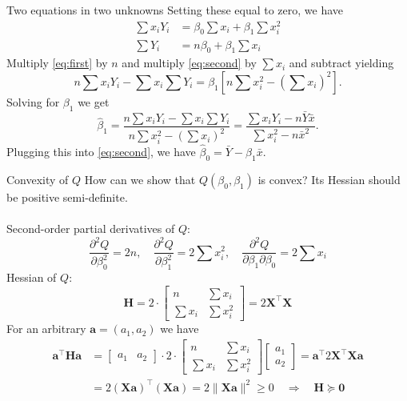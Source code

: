 \documentclass{beamer}
\begin{document}
\begin{frame}{Two equations in two unknowns}
Setting these equal to zero, we have
\begin{align}
\sum x_i Y_i&=\beta_0\sum x_i+\beta_1\sum x_i^2\label{eq:first}\\
\sum Y_i&=n\beta_0+\beta_1\sum x_i\label{eq:second}
\end{align}
\pause Multiply \eqref{eq:first} by $n$ and multiply \eqref{eq:second} by $\sum x_i$ and subtract yielding
$$
n\sum x_i Y_i-\sum x_i\sum Y_i = \beta_1\left[n\sum x_i^2-\left(\sum x_i\right)^2\right].
$$
\pause Solving for $\beta_1$ we get
$$
\hat\beta_1=\frac{n\sum x_i Y_i-\sum x_i\sum Y_i}{n\sum x_i^2-\left(\sum x_i\right)^2}=\frac{\sum x_i Y_i - n\bar{Y}\bar{x}}{\sum x_i^2-n\bar{x}^2}.
$$
Plugging this into \eqref{eq:second}, we have $\hat\beta_0=\bar{Y}-\hat\beta_1\bar{x}$.
\end{frame}

\begin{frame}{Convexity of $Q$}
How can we show that $Q(\beta_0,\beta_1)$ is convex? \pause Its Hessian should be positive semi-definite.\\~\\

\pause Second-order partial derivatives of $Q$:
$$
\frac{\partial^2 Q}{\partial\beta_0^2}=2n,\quad\frac{\partial^2 Q}{\partial\beta_1^2}=2\sum x_i^2,\quad
\frac{\partial^2 Q}{\partial\beta_1\partial\beta_0}=2\sum x_i
$$
\pause Hessian of $Q$:
$$
\mathbf{H}=2\cdot\begin{bmatrix}
n & \sum x_i \\
\sum x_i & \sum x_i^2
\end{bmatrix}=2\mathbf{X}^\top\mathbf{X}
$$
\pause For an arbitrary $\mathbf{a}=(a_1, a_2)$ we have
\begin{align*}
\mathbf{a}^\top\mathbf{H}\mathbf{a}&=\begin{bmatrix}
a_1 & a_2
\end{bmatrix}\cdot2\cdot\begin{bmatrix}
n & \sum x_i \\
\sum x_i & \sum x_i^2
\end{bmatrix}\begin{bmatrix}
a_1 \\ a_2
\end{bmatrix}=\mathbf{a}^\top 2\mathbf{X}^\top\mathbf{X}\mathbf{a}\\
&=2(\mathbf{X}\mathbf{a})^\top(\mathbf{X}\mathbf{a})=2\|\mathbf{X}\mathbf{a}\|^2\ge0\quad\Rightarrow\quad \mathbf{H}\succeq\mathbf{0}
\end{align*}
\end{frame}
\end{document}
